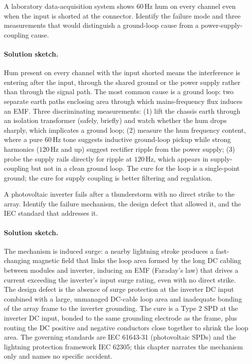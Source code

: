 \begin{exercise}
A laboratory data-acquisition system shows $60\,\si{\hertz}$ hum on
every channel even when the input is shorted at the connector.
Identify the failure mode and three measurements that would
distinguish a ground-loop cause from a power-supply-coupling cause.

\paragraph{Solution sketch.} Hum present on every channel with the input
shorted means the interference is entering after the input, through the
shared ground or the power supply rather than through the signal path.
The most common cause is a ground loop: two separate earth paths
enclosing area through which mains-frequency flux induces an EMF.
Three discriminating measurements: (1) lift the chassis earth through an
isolation transformer (safely, briefly) and watch whether the hum drops
sharply, which implicates a ground loop; (2) measure the hum frequency
content, where a pure $60\,\si{\hertz}$ tone suggests inductive
ground-loop pickup while strong harmonics ($120\,\si{\hertz}$ and up)
suggest rectifier ripple from the power supply; (3) probe the supply
rails directly for ripple at $120\,\si{\hertz}$, which appears in
supply-coupling but not in a clean ground loop. The cure for the loop is
a single-point ground; the cure for supply coupling is better filtering
and regulation.
\end{exercise}

\begin{exercise}
A photovoltaic inverter fails after a thunderstorm with no direct
strike to the array. Identify the failure mechanism, the design
defect that allowed it, and the IEC standard that addresses it.

\paragraph{Solution sketch.} The mechanism is induced surge: a nearby
lightning stroke produces a fast-changing magnetic field that links the
loop area formed by the long DC cabling between modules and inverter,
inducing an EMF (Faraday's law) that drives a current exceeding the
inverter's input surge rating, even with no direct strike. The design
defect is the absence of surge protection at the inverter DC input
combined with a large, unmanaged DC-cable loop area and inadequate
bonding of the array frame to the inverter grounding. The cure is a
Type 2 SPD at the inverter DC input, bonded to the same grounding
electrode as the frame, plus routing the DC positive and negative
conductors close together to shrink the loop area. The governing
standards are IEC 61643-31 (photovoltaic SPDs) and the lightning
protection framework IEC 62305; this chapter narrates the mechanism only
and names no specific accident.
\end{exercise}

